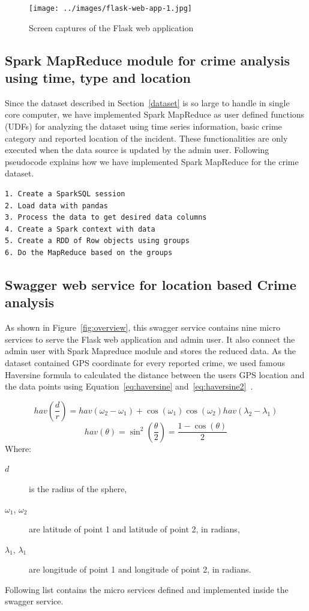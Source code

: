 \begin{figure}[htb]
	\centering\texttt{[image: ../images/flask-web-app-1.jpg]}
	\caption{Screen captures of the Flask web application}\label{fig:screencapture}
\end{figure}

\subsection{Spark MapReduce module for crime analysis using time, type and location}\label{sparkModule}
Since the dataset described in Section~\ref{dataset} is so large to
handle in single core computer, we have implemented Spark MapReduce as
user defined functions (UDFs) for analyzing the dataset using time
series information, basic crime category and reported location of the
incident. These functionalities are only executed when the data source
is updated by the admin user. Following pseudocode explains how we
have implemented Spark MapReduce for the crime dataset.

\begin{verbatim}
1. Create a SparkSQL session
2. Load data with pandas
3. Process the data to get desired data columns
4. Create a Spark context with data
5. Create a RDD of Row objects using groups
6. Do the MapReduce based on the groups
\end{verbatim}

\subsection{Swagger web service for location based Crime analysis}\label{swaggerService}
As shown in Figure~\ref{fig:overview}, this swagger service contains
nine micro services to serve the Flask web application and admin
user. It also connect the admin user with Spark Mapreduce module and
stores the reduced data. As the dataset contained GPS coordinate for
every reported crime, we used famous Haversine formula to calculated
the distance between the users GPS location and the data points using
Equation~\ref{eq:haversine}
and~\ref{eq:haversine2}~\cite{hid-sp18-409-siahaan2017haversine}.

\begin{equation}\label{eq:haversine}
hav(\frac{d}{r}) = hav(\omega_2 - \omega_1) + \cos(\omega_1)\cos(\omega_2)hav(\lambda_2 - \lambda_1)
\end{equation}
\begin{equation}\label{eq:haversine2}
hav(\theta) = \sin^2(\frac{\theta}{2}) = \frac{1-\cos(\theta)}{2}
\end{equation}
Where:
\begin{description}
\item[$d$] is the radius of the sphere,
\item[$\omega_1$, $\omega_2$] are latitude of point 1 and latitude of point 2, in radians,
\item[$\lambda_1$, $\lambda_1$] are longitude of point 1 and longitude of point 2, in radians.
\end{description}
Following list contains the micro services defined and implemented inside the swagger service.

